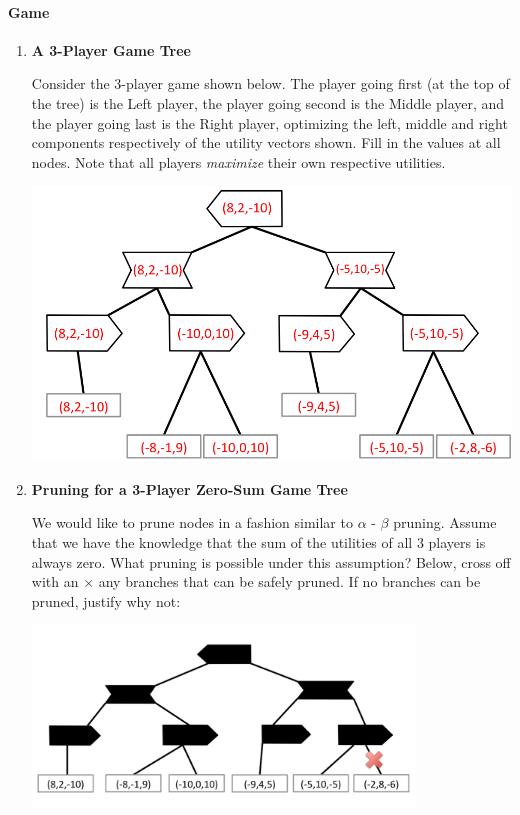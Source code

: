 \paragraph{Game}

\begin{enumerate}

\item {\bf A 3-Player Game Tree} 

Consider the 3-player game shown below.  The player going first (at the top
of the tree) is the Left player, the player going second is the Middle
player, and the player going last is the Right player, optimizing the
left, middle and right components respectively of the utility vectors shown.   Fill in the
values at all nodes.  Note that all players \emph{maximize} their
own respective utilities.

\begin{center}
    \includegraphics[width=5in]{figures/abg_solution}
\end{center}

\vspace{1cm}


\item {\bf Pruning for a 3-Player Zero-Sum Game Tree}

We would like to prune nodes in a fashion similar to $\alpha$ - $\beta$ pruning.  Assume that we have the knowledge that the sum of the utilities of all 3 players is always zero.
What pruning is possible under this assumption?  Below, cross off with an $\times$ any branches that can be safely pruned.   If no branches can be pruned, justify why not:

\begin{center}
     \includegraphics[width=4in]{figures/solution_b}
\end{center}


\end{enumerate}
